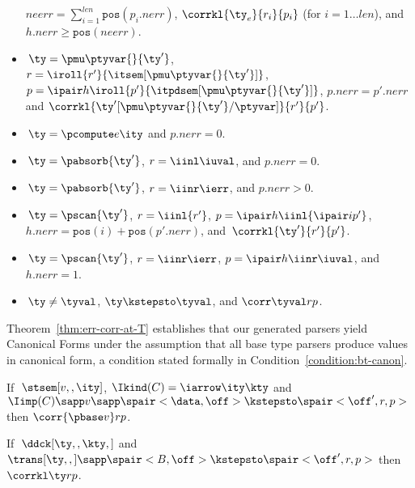 \begin{definition}
\begin{itemize}
    ${neerr} = \sum_{i=1}^{len} \mathtt{pos}(p_i.{nerr})$, 
    $\corrkl {\ty_e}
    {r_i} {p_i}$ (for $i=1 \ldots {len}$), and
    $h.{nerr} \geq \mathtt{pos}({neerr})$.
  \item $\,\ty = \pmu \ptyvar {} {\ty'}$, 
    $r = \iroll{r'}{\itsem[\pmu \ptyvar {} {\ty'}]}$, $p =
    \ipair h {\iroll{p'}{
                \itpdsem[\pmu \ptyvar {} {\ty'}]}}$, 
        $p.{nerr} = p'.{nerr}$ 
    and 
    $\corrkl {\ty'[\pmu \ptyvar {} {\ty'}/\ptyvar]} {r'} {p'}$.
  \item $\,\ty = \pcompute e \ity$ and $p.{nerr} = 0$.
  \item $\,\ty = \pabsorb {\ty'}$, $r = \iinl \iuval$, and $p.nerr = 0$.
  \item $\,\ty = \pabsorb {\ty'}$, $r = \iinr \ierr$, and $p.nerr > 0$.
  \item $\,\ty = \pscan {\ty'}$, $r =\iinl {r'}$,
      $p = \ipair h {\iinl {\ipair i {p'}}}$,
      $h.nerr = \mathtt{pos}(i) + \mathtt{pos}(p'.nerr)$, and \linebreak
      $\, \corrkl {\ty'}{r'}{p'}$.
  \item $\,\ty = \pscan {\ty'}$,
      $r =\iinr \ierr$,
      $p = \ipair h {\iinr \iuval}$, and
      $h.{nerr} = 1$.
  \item $\,\ty \not = \tyval$, $\ty \kstepsto \tyval$, and $\corr \tyval r p$.
  \end{itemize}
\end{definition}

Theorem~\ref{thm:err-corr-at-T} establishes that our generated parsers
yield Canonical Forms under the assumption that all base type
parsers produce values in canonical form, a condition stated formally
in Condition~\ref{condition:bt-canon}.



\begin{condition}
\label{condition:bt-canon}
  If $\;\stsem[v,,\ity]$, $\Ikind(C) = \iarrow \ity \kty$ and $\Iimp(C)
  \sapp v \sapp \spair<\data,\off> \kstepsto \spair<\off',r,p>$ then
  $\corr {\pbase v} r p $.
\end{condition}

\begin{theorem}
\label{thm:err-corr-at-T}
If $\; \ddck[\ty,,\kty,]$ and $\trans[\ty,,] \sapp \spair<B,\off> \kstepsto
  \spair<\off',r,p>$ then $\corrkl \ty r p$.
\end{theorem}

